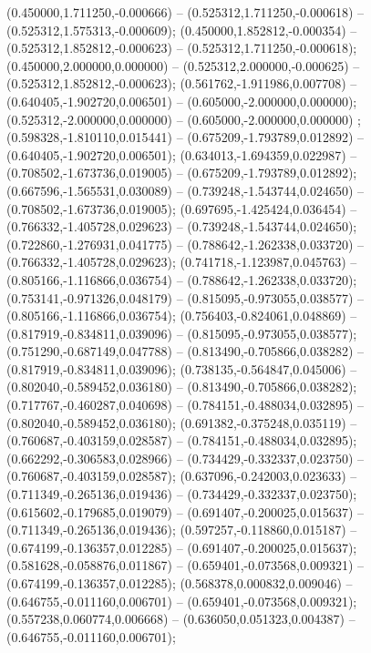  (0.450000,1.711250,-0.000666) -- (0.525312,1.711250,-0.000618) -- (0.525312,1.575313,-0.000609);
 (0.450000,1.852812,-0.000354) -- (0.525312,1.852812,-0.000623) -- (0.525312,1.711250,-0.000618);
 (0.450000,2.000000,0.000000) -- (0.525312,2.000000,-0.000625) -- (0.525312,1.852812,-0.000623);
 (0.561762,-1.911986,0.007708) -- (0.640405,-1.902720,0.006501) -- (0.605000,-2.000000,0.000000);
 (0.525312,-2.000000,0.000000) -- (0.605000,-2.000000,0.000000) ;
 (0.598328,-1.810110,0.015441) -- (0.675209,-1.793789,0.012892) -- (0.640405,-1.902720,0.006501);
 (0.634013,-1.694359,0.022987) -- (0.708502,-1.673736,0.019005) -- (0.675209,-1.793789,0.012892);
 (0.667596,-1.565531,0.030089) -- (0.739248,-1.543744,0.024650) -- (0.708502,-1.673736,0.019005);
 (0.697695,-1.425424,0.036454) -- (0.766332,-1.405728,0.029623) -- (0.739248,-1.543744,0.024650);
 (0.722860,-1.276931,0.041775) -- (0.788642,-1.262338,0.033720) -- (0.766332,-1.405728,0.029623);
 (0.741718,-1.123987,0.045763) -- (0.805166,-1.116866,0.036754) -- (0.788642,-1.262338,0.033720);
 (0.753141,-0.971326,0.048179) -- (0.815095,-0.973055,0.038577) -- (0.805166,-1.116866,0.036754);
 (0.756403,-0.824061,0.048869) -- (0.817919,-0.834811,0.039096) -- (0.815095,-0.973055,0.038577);
 (0.751290,-0.687149,0.047788) -- (0.813490,-0.705866,0.038282) -- (0.817919,-0.834811,0.039096);
 (0.738135,-0.564847,0.045006) -- (0.802040,-0.589452,0.036180) -- (0.813490,-0.705866,0.038282);
 (0.717767,-0.460287,0.040698) -- (0.784151,-0.488034,0.032895) -- (0.802040,-0.589452,0.036180);
 (0.691382,-0.375248,0.035119) -- (0.760687,-0.403159,0.028587) -- (0.784151,-0.488034,0.032895);
 (0.662292,-0.306583,0.028966) -- (0.734429,-0.332337,0.023750) -- (0.760687,-0.403159,0.028587);
 (0.637096,-0.242003,0.023633) -- (0.711349,-0.265136,0.019436) -- (0.734429,-0.332337,0.023750);
 (0.615602,-0.179685,0.019079) -- (0.691407,-0.200025,0.015637) -- (0.711349,-0.265136,0.019436);
 (0.597257,-0.118860,0.015187) -- (0.674199,-0.136357,0.012285) -- (0.691407,-0.200025,0.015637);
 (0.581628,-0.058876,0.011867) -- (0.659401,-0.073568,0.009321) -- (0.674199,-0.136357,0.012285);
 (0.568378,0.000832,0.009046) -- (0.646755,-0.011160,0.006701) -- (0.659401,-0.073568,0.009321);
 (0.557238,0.060774,0.006668) -- (0.636050,0.051323,0.004387) -- (0.646755,-0.011160,0.006701);
